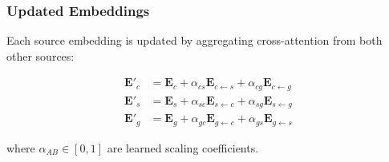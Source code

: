 \documentclass[10pt,twocolumn]{article}
\begin{document}
\subsubsection{Updated Embeddings}

Each source embedding is updated by aggregating cross-attention from both other sources:

\begin{align}
\mathbf{E}'_c &= \mathbf{E}_c + \alpha_{cs}\mathbf{E}_{c \leftarrow s} + \alpha_{cg}\mathbf{E}_{c \leftarrow g} \\
\mathbf{E}'_s &= \mathbf{E}_s + \alpha_{sc}\mathbf{E}_{s \leftarrow c} + \alpha_{sg}\mathbf{E}_{s \leftarrow g} \\
\mathbf{E}'_g &= \mathbf{E}_g + \alpha_{gc}\mathbf{E}_{g \leftarrow c} + \alpha_{gs}\mathbf{E}_{g \leftarrow s}
\end{align}

where $\alpha_{AB} \in [0, 1]$ are learned scaling coefficients.
\end{document}
